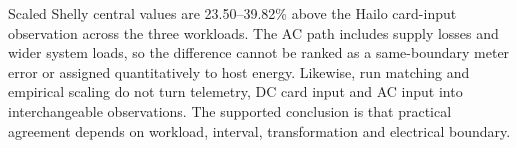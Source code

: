 Scaled Shelly central values are 23.50--39.82\% above the Hailo card-input observation across the three workloads. The AC path includes supply losses and wider system loads, so the difference cannot be ranked as a same-boundary meter error or assigned quantitatively to host energy. Likewise, run matching and empirical scaling do not turn telemetry, DC card input and AC input into interchangeable observations. The supported conclusion is that practical agreement depends on workload, interval, transformation and electrical boundary.
